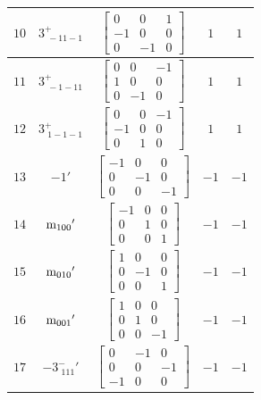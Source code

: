 \documentclass[fleqn,8pt]{jsarticle}
\begin{document}
\begin{longtable}{ccccc}
$ 10 $ & $ 3^{+}_{\,\,-11-1} $ & $ \begin{bmatrix} 0 & 0 & 1 \\ -1 & 0 & 0 \\ 0 & -1 & 0 \end{bmatrix} $ & $ 1 $ & $ 1 $ \\ \hline
$ 11 $ & $ 3^{+}_{\,\,-1-11} $ & $ \begin{bmatrix} 0 & 0 & -1 \\ 1 & 0 & 0 \\ 0 & -1 & 0 \end{bmatrix} $ & $ 1 $ & $ 1 $ \\ \hline
$ 12 $ & $ 3^{+}_{\,\,1-1-1} $ & $ \begin{bmatrix} 0 & 0 & -1 \\ -1 & 0 & 0 \\ 0 & 1 & 0 \end{bmatrix} $ & $ 1 $ & $ 1 $ \\ \hline
$ 13 $ & $ -1{}' $ & $ \begin{bmatrix} -1 & 0 & 0 \\ 0 & -1 & 0 \\ 0 & 0 & -1 \end{bmatrix} $ & $ -1 $ & $ -1 $ \\ \hline
$ 14 $ & $ {\rm m}_{100}{}' $ & $ \begin{bmatrix} -1 & 0 & 0 \\ 0 & 1 & 0 \\ 0 & 0 & 1 \end{bmatrix} $ & $ -1 $ & $ -1 $ \\ \hline
$ 15 $ & $ {\rm m}_{010}{}' $ & $ \begin{bmatrix} 1 & 0 & 0 \\ 0 & -1 & 0 \\ 0 & 0 & 1 \end{bmatrix} $ & $ -1 $ & $ -1 $ \\ \hline
$ 16 $ & $ {\rm m}_{001}{}' $ & $ \begin{bmatrix} 1 & 0 & 0 \\ 0 & 1 & 0 \\ 0 & 0 & -1 \end{bmatrix} $ & $ -1 $ & $ -1 $ \\ \hline
$ 17 $ & $ -3^{-}_{\,\,111}{}' $ & $ \begin{bmatrix} 0 & -1 & 0 \\ 0 & 0 & -1 \\ -1 & 0 & 0 \end{bmatrix} $ & $ -1 $ & $ -1 $ \\ \hline

\end{longtable}
\end{document}
